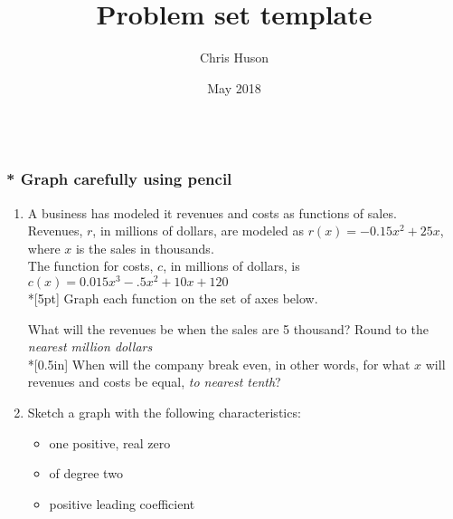 \documentclass[12pt, oneside]{article}
\title{Problem set template}
\author{Chris Huson}
\date{May 2018}
\begin{document}

\subsubsection*{\\* \textnormal{Graph carefully using pencil}}

\begin{enumerate}

\item A business has modeled it revenues and costs as functions of sales.\\[5pt] Revenues, $r$, in millions of dollars, are modeled as $r\left(x\right)=-0.15x^2+25x$, where $x$ is the sales in thousands.\\[5pt]
The function for costs, $c$, in millions of dollars, is $c\left(x\right)=0.015x^3-.5x^2+10x+120$\\*[5pt]
Graph each function on the set of axes below.
\begin{center}
\end{center}
What will the revenues be when the sales are 5 thousand? Round to the \emph{nearest million dollars}\\*[0.5in]
When will the company break even, in other words, for what $x$ will revenues and costs be equal, \emph{to nearest tenth}? 

\newpage

\item Sketch a graph with the following characteristics: 
\begin{itemize}
\item one positive, real zero
\item of degree two
\item positive leading coefficient
\end{itemize}
\begin{center}
\end{center}



\end{enumerate}
\end{document}
